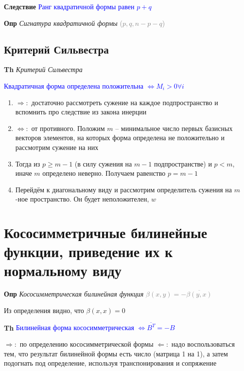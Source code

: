\documentclass[a4paper, 14pt]{article}
\begin{document}
    \textbf{Следствие} \textcolor{blue}{Ранг квадратичной формы равен $p + q$}

    \textbf{Опр} \textit{Сигнатура квадратичной формы} \textcolor{gray}{($p, q, n - p - q$)}

    \subsection{Критерий Сильвестра}

    \textbf{Th} \textit{Критерий Сильвестра}

    \textcolor{blue}{Квадратичная форма определена положительна $\Leftrightarrow M_i > 0 \forall i$}

    \begin{enumerate}
        \item $\Rightarrow:$ достаточно рассмотреть сужение на каждое подпространство и вспомнить про следствие из
        закона инерции
        \item $\Leftrightarrow:$ от противного.
        Положим $m$ -- минимальное число первых базисных векторов элементов, на которых форма определена не
        положительно и рассмотрим сужение на них
        \item Тогда из $p \geq m - 1$ (в силу сужения на $m - 1$ подпространстве) и $p < m$, иначе $m$ определено
        неверно.
        Получаем равенство $p = m - 1$
        \item Перейдём к диагональному виду и рассмотрим определитель сужения на $m$-ное пространство.
        Он будет неположителен, $w$
    \end{enumerate}


    \section{Кососимметричные билинейные функции, приведение их к нормальному виду}

    \textbf{Опр} \textit{Кососимметрическая билинейная функция} \textcolor{gray}{$\beta (x, y) = - \overline{\beta (y, x)}$}

    Из определения видно, что $\beta (x, x) = 0$

    \textbf{Th} \textcolor{blue}{Билинейная форма кососимметрическая $\Leftrightarrow \overline{B^T}= -B$}

    $\Rightarrow:$ по определению кососимметрической формы
    $\Leftarrow:$ надо воспользоваться тем, что результат билинейной формы есть число (матрица 1 на 1), а затем
    подогнать под определение, используя транспонирования и сопряжение
\end{document}
